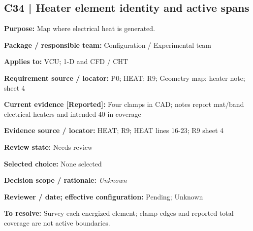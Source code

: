 \documentclass[11pt]{article}
\begin{document}
\par\noindent\begin{minipage}{\textwidth}\small\setlength{\parskip}{2pt}
\subsection*{C34 | Heater element identity and active spans}
\textbf{Purpose:} Map where electrical heat is generated.\par
\textbf{Package / responsible team:} Configuration / Experimental team\par
\textbf{Applies to:} VCU; 1-D and CFD / CHT\par
\textbf{Requirement source / locator:} P0; HEAT; R9; Geometry map; heater note; sheet 4\par
\textbf{Current evidence [Reported]:} Four clamps in CAD; notes report mat/band electrical heaters and intended 40-in coverage\par
\textbf{Evidence source / locator:} HEAT; R9; HEAT lines 16-23; R9 sheet 4\par
\textbf{Review state:} Needs review\par
\textbf{Selected choice:} None selected\par
\textbf{Decision scope / rationale:} \textit{Unknown}\par
\textbf{Reviewer / date; effective configuration:} Pending; Unknown\par
\textbf{To resolve:} Survey each energized element; clamp edges and reported total coverage are not active boundaries.\par
\end{minipage}\par\vspace{5pt}
\end{document}

